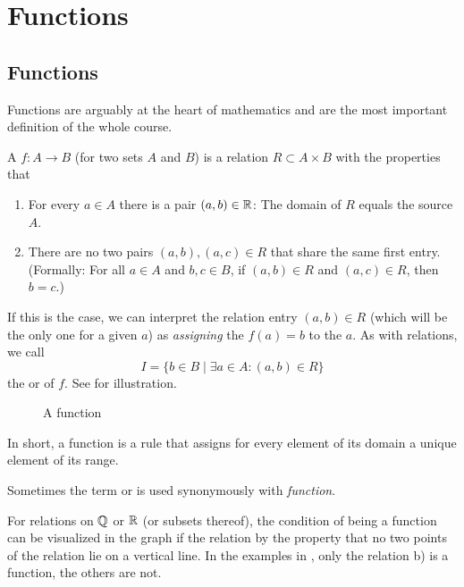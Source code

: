 \chapter{Functions}
\label{chfuns}

\section{Functions}

Functions are arguably at the heart of mathematics and are the most
important definition of the whole course.

\begin{defn}
A  $f\colon A\to B$ (for two sets $A$ and $B$) is a relation $R\subset
A\times B$ with the properties that
\begin{enumerate}
\item
For every $a\in A$ there is a pair $(a,b)\in{\mathbb R}$: The domain of $R$ equals the source $A$.
\item
There
are no two pairs $(a,b),(a,c)\in R$ that share the same first entry.
(Formally:
For all $a\in A$ and $b,c\in B$, if $(a,b)\in R$ and
$(a,c)\in R$, then $b=c$.)
\end{enumerate}
If this is the case, we can interpret the relation entry $(a,b)\in R$ (which
will be the only one for a given $a$) as {\em assigning} the 
$f(a)=b$ to the  $a$. As with relations, we call
\[
I=\{b\in B\mid \exists a\in A: (a,b)\in R\}
\]
the  or  of $f$.
See  for illustration.
\end{defn}

\begin{figure}[t]
\begin{center}
\end{center}
\caption{A function}
\label{figgeneralfct}
\end{figure}

In short, a function is a rule that assigns for every element of its domain
a unique element of its range.

Sometimes the term  or  is used synonymously
with {\em function}.

For relations on ${\mathbb Q}$ or ${\mathbb R}$ (or subsets thereof), the condition of being a
function can be
visualized in the graph if the relation by the property that no two points
of the relation lie on a vertical line. In the examples in
, only the relation b) is a function, the others
are not.
\smallskip

